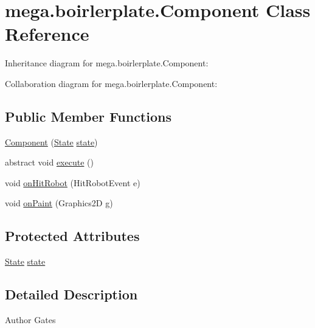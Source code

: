 \hypertarget{classmega_1_1boirlerplate_1_1_component}{}\section{mega.\+boirlerplate.\+Component Class Reference}
\label{classmega_1_1boirlerplate_1_1_component}


Inheritance diagram for mega.\+boirlerplate.\+Component\+:


Collaboration diagram for mega.\+boirlerplate.\+Component\+:
\subsection*{Public Member Functions}
\begin{DoxyCompactItemize}
\item 
\hyperlink{classmega_1_1boirlerplate_1_1_component_af8f17c88007aaedc016c1f72788d26dc}{Component} (\hyperlink{classmega_1_1boirlerplate_1_1_state}{State} \hyperlink{classmega_1_1boirlerplate_1_1_component_a87b0d70f323b5fee60a200e07c9c20fd}{state})
\item 
abstract void \hyperlink{classmega_1_1boirlerplate_1_1_component_a875c3bb3ba84f8187e2490ddd7fb90f4}{execute} ()
\item 
void \hyperlink{classmega_1_1boirlerplate_1_1_component_a6c365c1f62450c8368c378b22eb7aff2}{on\+Hit\+Robot} (Hit\+Robot\+Event e)
\item 
void \hyperlink{classmega_1_1boirlerplate_1_1_component_a11a2a4904db56aa6a62b1efb2d9138a4}{on\+Paint} (Graphics2D g)
\end{DoxyCompactItemize}
\subsection*{Protected Attributes}
\begin{DoxyCompactItemize}
\item 
\hyperlink{classmega_1_1boirlerplate_1_1_state}{State} \hyperlink{classmega_1_1boirlerplate_1_1_component_a87b0d70f323b5fee60a200e07c9c20fd}{state}
\end{DoxyCompactItemize}


\subsection{Detailed Description}
\begin{DoxyAuthor}{Author}
Gates 
\end{DoxyAuthor}


